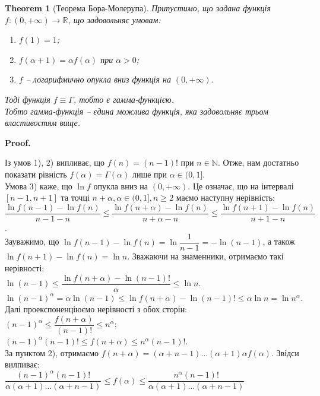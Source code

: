 \documentclass[a4paper, 10pt]{article}
\makeatletter
\theoremstyle{theoremdd}
\newtheorem{theorem}{Theorem}[subsection]
\theoremstyle{theoremdd}
\theoremstyle{theoremdd}
\theoremstyle{theoremdd}
\theoremstyle{theoremdd}
\theoremstyle{theoremdd}
\theoremstyle{theoremdd}
\theoremstyle{theoremdd}
\theoremstyle{theoremdd}
\renewenvironment{proof}[1][Proof.\\]{\par
\pushQED{\hfill \qed}%
\normalfont \topsep6\p@\@plus6\p@\relax
\trivlist
\item\relax
{\bfseries
#1\@addpunct{.}}\hspace\labelsep\ignorespaces
}{%
\popQED\endtrivlist\@endpefalse
}
\makeatother
\begin{document}
\begin{theorem}[Теорема Бора-Молерупа]
Припустимо, що задана функція $f \colon (0,+\infty) \to \mathbb{R}$, що задовольняє умовам:
\begin{enumerate}[nosep,wide=0pt,label={\arabic*)}]
\item $f(1) = 1$;
\item $f(\alpha+1) = \alpha f(\alpha)$ при $\alpha > 0$;
\item $f$ -- логарифмично опукла вниз функція на $(0,+\infty)$.
\end{enumerate}
Тоді функція $f \equiv \Gamma$, тобто є гамма-функцією.\\
Тобто гамма-функція -- єдина можлива функція, яка задовольняє трьом властивостям вище.
\end{theorem}

\begin{proof}
Із умов 1), 2) випливає, що $f(n) = (n-1)!$ при $n \in \mathbb{N}$. Отже, нам достатньо показати рівність $f(\alpha) = \Gamma(\alpha)$ лише при $\alpha \in (0,1]$.\\
Умова 3) каже, що $\ln f$ опукла вниз на $(0,+\infty)$. Це означає, що на інтервалі $[n-1,n+1]$ та точці $n+\alpha, \alpha \in (0,1], n \geq 2$ маємо наступну нерівність:\\
$\dfrac{\ln f(n-1) - \ln f(n)}{n-1-n} \leq \dfrac{\ln f(n+\alpha) - \ln f(n)}{n+\alpha - n} \leq \dfrac{\ln f(n+1) - \ln f(n)}{n+1-n}$.\\
Зауважимо, що $\ln f(n-1) - \ln f(n) = \ln \dfrac{1}{n-1} = -\ln (n-1)$, а також $\ln f(n+1) - \ln f(n) = \ln n$. Зважаючи на знаменники, отримаємо такі нерівності:\\
$\ln (n-1) \leq \dfrac{\ln f(n+\alpha) - \ln (n-1)!}{\alpha} \leq \ln n$.\\
$\ln (n-1)^\alpha = \alpha \ln (n-1) \leq \ln f(n+\alpha) - \ln (n-1)! \leq \alpha \ln n = \ln n^\alpha$.\\
Далі проекспоненціюємо нерівності з обох сторін:\\
$(n-1)^\alpha \leq \dfrac{f(n+\alpha)}{(n-1)!} \leq n^\alpha$;\\
$(n-1)^\alpha (n-1)! \leq f(n+\alpha) \leq n^\alpha (n-1)!$.\\
За пунктом 2), отримаємо $f(n+\alpha) = (\alpha + n-1) \dots (\alpha+1)\alpha f(\alpha)$. Звідси вилпиває:\\
$\dfrac{(n-1)^\alpha (n-1)!}{\alpha (\alpha+1) \dots (\alpha+n-1)} \leq f(\alpha) \leq \dfrac{n^\alpha (n-1)!}{\alpha (\alpha+1) \dots (\alpha+n-1)}$\\

\end{proof}
\end{document}
